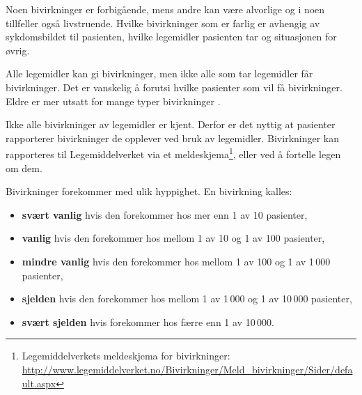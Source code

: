 Noen bivirkninger er forbigående, mens andre kan være alvorlige og i noen tillfeller også livstruende. Hvilke bivirkninger som er farlig er avhengig av sykdomsbildet til pasienten, hvilke legemidler pasienten tar og situasjonen for øvrig. 

Alle legemidler kan gi bivirkninger, men ikke alle som tar legemidler får bivirkninger. Det er vanskelig å forutsi hvilke pasienter som vil få bivirkninger. Eldre er mer utsatt for mange typer bivirkninger \citep{AdverseDrugReactions}.

Ikke alle bivirkninger av legemidler er kjent. Derfor er det nyttig at pasienter rapporterer bivirkninger de opplever ved bruk av legemidler. Bivirkninger kan rapporteres til Legemiddelverket via et meldeskjema\footnote{Legemiddelverkets meldeskjema for bivirkninger: \url{http://www.legemiddelverket.no/Bivirkninger/Meld_bivirkninger/Sider/default.aspx}}, eller ved å fortelle legen om dem.

Bivirkninger forekommer med ulik hyppighet. En bivirkning kalles:
\begin{itemize}
\item \textbf{svært vanlig} hvis den forekommer hos mer enn 1 av 10 pasienter,
\item \textbf{vanlig} hvis den forekommer hos mellom 1 av 10 og 1 av 100 pasienter,
\item \textbf{mindre vanlig} hvis den forekommer hos mellom 1 av 100 og 1 av 1\,000 pasienter,
\item \textbf{sjelden} hvis den forekommer hos mellom 1 av 1\,000 og 1 av 10\,000 pasienter,
\item \textbf{svært sjelden} hvis forekommer hos færre enn 1 av 10\,000.
\end{itemize}
